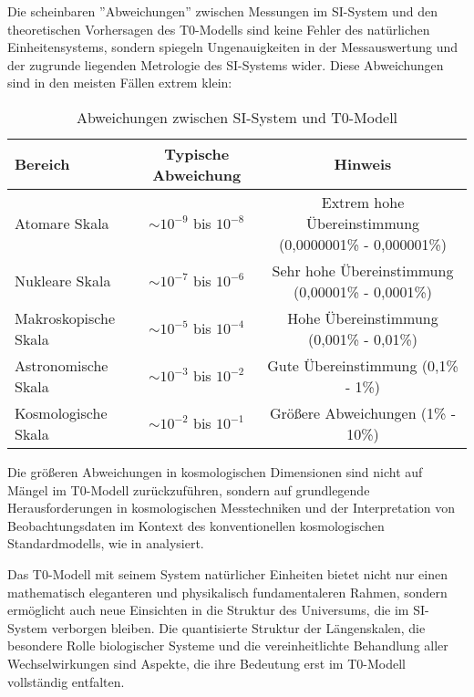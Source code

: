\documentclass[12pt,a4paper]{article}
\begin{document}
Die scheinbaren ''Abweichungen'' zwischen Messungen im SI-System und den theoretischen Vorhersagen des T0-Modells sind keine Fehler des natürlichen Einheitensystems, sondern spiegeln Ungenauigkeiten in der Messauswertung und der zugrunde liegenden Metrologie des SI-Systems wider. Diese Abweichungen sind in den meisten Fällen extrem klein:

\begin{table}[H]
	\centering
	\begin{adjustbox}{width=0.95\textwidth}
		\begin{tabular}{lcc}
			\toprule
			\textbf{Bereich} & \textbf{Typische Abweichung} & \textbf{Hinweis} \\
			\midrule
			Atomare Skala & $\sim10^{-9}$ bis $10^{-8}$ & Extrem hohe Übereinstimmung (0,0000001\% - 0,000001\%) \\
			Nukleare Skala & $\sim10^{-7}$ bis $10^{-6}$ & Sehr hohe Übereinstimmung (0,00001\% - 0,0001\%) \\
			Makroskopische Skala & $\sim10^{-5}$ bis $10^{-4}$ & Hohe Übereinstimmung (0,001\% - 0,01\%) \\
			Astronomische Skala & $\sim10^{-3}$ bis $10^{-2}$ & Gute Übereinstimmung (0,1\% - 1\%) \\
			Kosmologische Skala & $\sim10^{-2}$ bis $10^{-1}$ & Größere Abweichungen (1\% - 10\%) \\
			\bottomrule
		\end{tabular}
	\end{adjustbox}
	\caption{Abweichungen zwischen SI-System und T0-Modell}
	\label{tab:deviations}
\end{table}

Die größeren Abweichungen in kosmologischen Dimensionen sind nicht auf Mängel im T0-Modell zurückzuführen, sondern auf grundlegende Herausforderungen in kosmologischen Messtechniken und der Interpretation von Beobachtungsdaten im Kontext des konventionellen kosmologischen Standardmodells, wie in \cite{pascher_messdifferenzen_2025} analysiert.

Das T0-Modell mit seinem System natürlicher Einheiten bietet nicht nur einen mathematisch eleganteren und physikalisch fundamentaleren Rahmen, sondern ermöglicht auch neue Einsichten in die Struktur des Universums, die im SI-System verborgen bleiben. Die quantisierte Struktur der Längenskalen, die besondere Rolle biologischer Systeme und die vereinheitlichte Behandlung aller Wechselwirkungen sind Aspekte, die ihre Bedeutung erst im T0-Modell vollständig entfalten.
\end{document}
